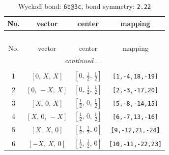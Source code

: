 \documentclass[fleqn,8pt]{jsarticle}
\begin{document}
\renewcommand{\arraystretch}{1.2}
\begin{longtable}{cccc}
\caption{Wyckoff bond: {\tt 6b@3c}, bond symmetry: {\tt 2.22}}
 \\
 \hline \hline
No. & vector & center & mapping \\ \hline \endfirsthead

\multicolumn{3}{l}{\tablename\ \thetable{}} \\
 \hline \hline
No. & vector & center & mapping \\ \hline \endhead

 \hline \hline
\multicolumn{3}{r}{\footnotesize\it continued ...} \\ \endfoot

 \hline \hline
\multicolumn{3}{r}{} \\ \endlastfoot

1 & $\left[ 0,\, X,\, X \right]$ & $\left[ 0,\, \frac{1}{2},\, \frac{1}{2} \right]$ & {\tt [1,-4,18,-19]} \\ \hline
2 & $\left[ 0,\, - X,\, X \right]$ & $\left[ 0,\, \frac{1}{2},\, \frac{1}{2} \right]$ & {\tt [2,-3,-17,20]} \\ \hline
3 & $\left[ X,\, 0,\, X \right]$ & $\left[ \frac{1}{2},\, 0,\, \frac{1}{2} \right]$ & {\tt [5,-8,-14,15]} \\ \hline
4 & $\left[ X,\, 0,\, - X \right]$ & $\left[ \frac{1}{2},\, 0,\, \frac{1}{2} \right]$ & {\tt [6,-7,13,-16]} \\ \hline
5 & $\left[ X,\, X,\, 0 \right]$ & $\left[ \frac{1}{2},\, \frac{1}{2},\, 0 \right]$ & {\tt [9,-12,21,-24]} \\ \hline
6 & $\left[ - X,\, X,\, 0 \right]$ & $\left[ \frac{1}{2},\, \frac{1}{2},\, 0 \right]$ & {\tt [10,-11,-22,23]} \\
\end{longtable}
\renewcommand{\arraystretch}{1.2}
\end{document}
